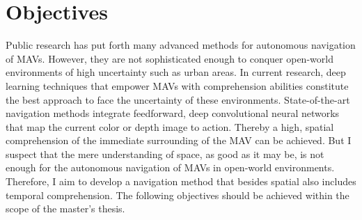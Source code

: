 \chapter{Objectives}

Public research has put forth many advanced methods for autonomous navigation of MAVs.
However, they are not sophisticated enough to conquer open-world environments of high uncertainty
such as urban areas. \cite{loquercio2018learning}
In current research, deep learning techniques that empower MAVs with comprehension abilities
constitute the best approach to face the uncertainty of these environments.
State-of-the-art navigation methods 
integrate feedforward, deep convolutional neural networks
that map the current color or depth image to action.
Thereby a high, spatial comprehension
of the immediate surrounding of the MAV can be achieved.
But I suspect that the mere understanding of space, as good as it may be,
is not enough for the autonomous navigation of MAVs
in open-world environments.
Therefore, I aim to develop a navigation method that besides spatial also includes temporal comprehension.
The following objectives should be achieved within the scope of the master's thesis.


